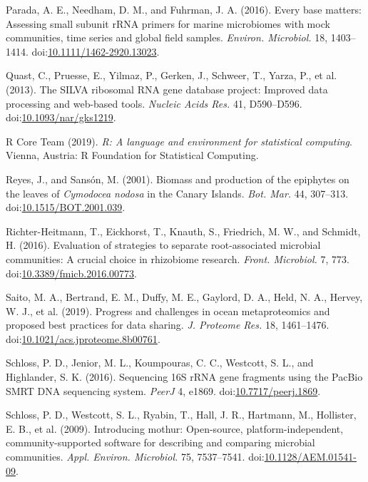 \documentclass[12pt,]{article}
\begin{document}
\leavevmode\hypertarget{ref-Parada2016}{}%
Parada, A. E., Needham, D. M., and Fuhrman, J. A. (2016). Every base
matters: Assessing small subunit rRNA primers for marine microbiomes
with mock communities, time series and global field samples.
\emph{Environ. Microbiol.} 18, 1403--1414.
doi:\href{https://doi.org/10.1111/1462-2920.13023}{10.1111/1462-2920.13023}.

\leavevmode\hypertarget{ref-Quast2013}{}%
Quast, C., Pruesse, E., Yilmaz, P., Gerken, J., Schweer, T., Yarza, P.,
et al. (2013). The SILVA ribosomal RNA gene database project: Improved
data processing and web-based tools. \emph{Nucleic Acids Res.} 41,
D590--D596.
doi:\href{https://doi.org/10.1093/nar/gks1219}{10.1093/nar/gks1219}.

\leavevmode\hypertarget{ref-RCoreTeam2019}{}%
R Core Team (2019). \emph{R: A language and environment for statistical
computing}. Vienna, Austria: R Foundation for Statistical Computing.

\leavevmode\hypertarget{ref-Reyes2001}{}%
Reyes, J., and Sansón, M. (2001). Biomass and production of the
epiphytes on the leaves of \emph{Cymodocea nodosa} in the Canary
Islands. \emph{Bot. Mar.} 44, 307--313.
doi:\href{https://doi.org/10.1515/BOT.2001.039}{10.1515/BOT.2001.039}.

\leavevmode\hypertarget{ref-Richter-Heitmann2016}{}%
Richter-Heitmann, T., Eickhorst, T., Knauth, S., Friedrich, M. W., and
Schmidt, H. (2016). Evaluation of strategies to separate root-associated
microbial communities: A crucial choice in rhizobiome research.
\emph{Front. Microbiol.} 7, 773.
doi:\href{https://doi.org/10.3389/fmicb.2016.00773}{10.3389/fmicb.2016.00773}.

\leavevmode\hypertarget{ref-Saito2019}{}%
Saito, M. A., Bertrand, E. M., Duffy, M. E., Gaylord, D. A., Held, N.
A., Hervey, W. J., et al. (2019). Progress and challenges in ocean
metaproteomics and proposed best practices for data sharing. \emph{J.
Proteome Res.} 18, 1461--1476.
doi:\href{https://doi.org/10.1021/acs.jproteome.8b00761}{10.1021/acs.jproteome.8b00761}.

\leavevmode\hypertarget{ref-Schloss2016}{}%
Schloss, P. D., Jenior, M. L., Koumpouras, C. C., Westcott, S. L., and
Highlander, S. K. (2016). Sequencing 16S rRNA gene fragments using the
PacBio SMRT DNA sequencing system. \emph{PeerJ} 4, e1869.
doi:\href{https://doi.org/10.7717/peerj.1869}{10.7717/peerj.1869}.

\leavevmode\hypertarget{ref-Schloss2009}{}%
Schloss, P. D., Westcott, S. L., Ryabin, T., Hall, J. R., Hartmann, M.,
Hollister, E. B., et al. (2009). Introducing mothur: Open-source,
platform-independent, community-supported software for describing and
comparing microbial communities. \emph{Appl. Environ. Microbiol.} 75,
7537--7541.
doi:\href{https://doi.org/10.1128/AEM.01541-09}{10.1128/AEM.01541-09}.
\end{document}
